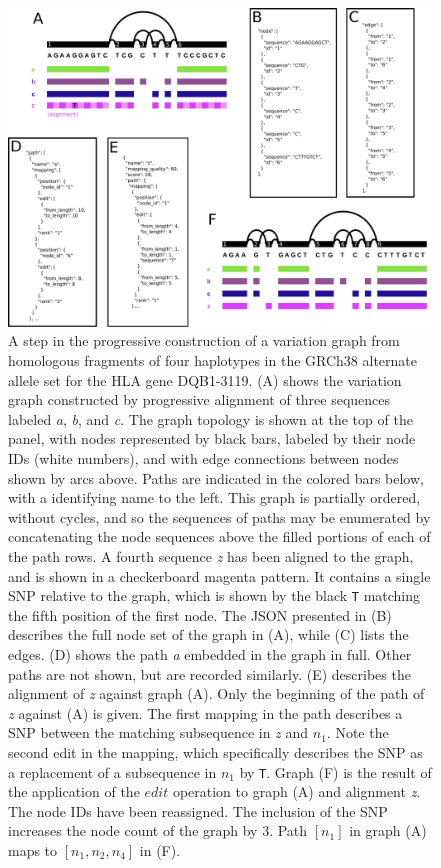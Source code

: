 \begin{figure}[htbp!]
  \includegraphics[width=\textwidth]{Chapter2/Figs/example_vg_construction.pdf}
  \caption[The basic elements of a variation graph]{
    A step in the progressive construction of a variation graph from homologous fragments of four haplotypes in the GRCh38 alternate allele set for the HLA gene DQB1-3119.
    (A) shows the variation graph constructed by progressive alignment of three sequences labeled \emph{a}, \emph{b}, and \emph{c}.
    The graph topology is shown at the top of the panel, with nodes represented by black bars, labeled by their node IDs (white numbers), and with edge connections between nodes shown by arcs above.
    Paths are indicated in the colored bars below, with a identifying name to the left.
    This graph is partially ordered, without cycles, and so the sequences of paths may be enumerated by concatenating the node sequences above the filled portions of each of the path rows.
    A fourth sequence \emph{z} has been aligned to the graph, and is shown in a checkerboard magenta pattern.
    It contains a single SNP relative to the graph, which is shown by the black {\tt T} matching the fifth position of the first node.
    The JSON presented in (B) describes the full node set of the graph in (A), while (C) lists the edges.
    (D) shows the path \emph{a} embedded in the graph in full. Other paths are not shown, but are recorded similarly.
    (E) describes the alignment of \emph{z} against graph (A). Only the beginning of the path of \emph{z} against (A) is given.
    The first mapping in the path describes a SNP between the matching subsequence in \emph{z} and $n_1$.
    Note the second edit in the mapping, which specifically describes the SNP as a replacement of a subsequence in $n_1$ by {\tt T}.
    Graph (F) is the result of the application of the $edit$ operation to graph (A) and alignment \emph{z}.
    The node IDs have been reassigned.
    The inclusion of the SNP increases the node count of the graph by 3.
    Path $[n_1]$ in graph (A) maps to $[n_1,n_2,n_4]$ in (F).
  }
  \label{fig:vg_illustrative_example}
\end{figure}

